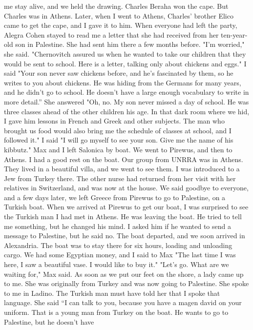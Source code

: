 me stay alive, and we held the drawing.
Charles Beraha won the cape.
But Charles was in 
Athens.
Later, when I went to Athens, Charles' brother Elico came to get the 
cape, and I gave it to him.
When everyone had left the party, Alegra Cohen stayed to read me a letter that she 
had received from her ten-year-old son in Palestine.
She had sent him there a few months 
before.
"I'm worried," she said.
"Chernovitch assured us when he wanted to take our 
children that they would be sent to school.
Here is a letter, talking only about chickens and eggs."
I said "Your son never saw chickens before, and he's fascinated by them, so he 
writes to you about chickens.
He was hiding from the Germans for many years, and he 
didn't go to school.
He doesn't have a large enough vocabulary to write in more detail.”
She answered "Oh, no.
My son never missed a day of school.
He was three classes 
ahead of the other children his age.
In that dark room where we hid, I gave him lessons in French and Greek and other subjects.
The man who brought us food would also 
bring me the schedule of classes at school, and I followed it."
I said "I will go myself to see your son.
Give me the name of his kibbutz."
Max and I left Salonica by boat.
We went to Pirewus, and then to Athens.
I had a 
good rest on the boat.
Our group from UNRRA was in Athens.
They lived in a beautiful 
villa, and we went to see them.
I was introduced to a Jew from Turkey there.
The other 
nurse had returned from her visit with her relatives in Switzerland, and was now at the 
house.
We said goodbye to everyone, and a few days later, we left Greece from Pirewus 
to go to Palestine, on a Turkish boat.
When we arrived at Pirewus to get our boat, I was surprised to see the Turkish man I 
had met in Athens.
He was leaving the boat.
He tried to tell me something, but he changed his mind.
I asked him if he wanted to send a message to Palestine, but he said no.
The boat departed, and we soon arrived in Alexandria.
The boat was to stay there 
for six hours, loading and unloading cargo.
We had some Egyptian money, and I said to 
Max "The last time I was here, I saw a beautiful vase.
I would like to buy it."
"Let's go.
What are we waiting for," Max said.
As soon as we put our feet on the shore, a lady came up to me.
She was originally 
from Turkey and was now going to Palestine.
She spoke to me in Ladino.
The Turkish man 
must have told her that I spoke that language.
She said “I can talk to you, because you have a magen david on your uniform.
That
is a young man from Turkey on the boat.
He wants to go to Palestine, but he doesn't have 
